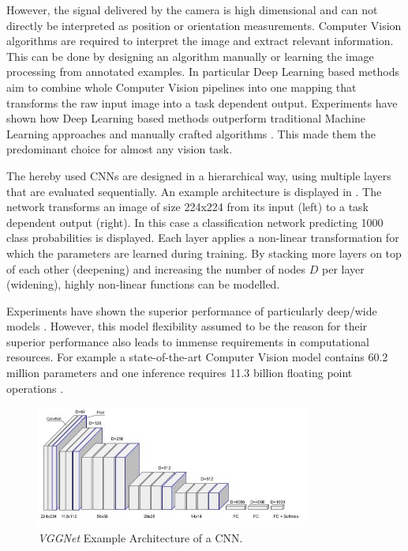 However, the signal delivered by the camera is high dimensional and can not directly be interpreted as position or orientation measurements. Computer Vision algorithms are required to interpret the image and extract relevant information. This can be done by designing an algorithm manually or learning the image processing from annotated examples. In particular Deep Learning based methods aim to combine whole Computer Vision pipelines into one mapping that transforms the raw input image into a task dependent output. Experiments have shown how Deep Learning based methods outperform traditional Machine Learning approaches and manually crafted algorithms \cite{Razavian2014}. This made them the predominant choice for almost any vision task.

The hereby used \acp{CNN} are designed in a hierarchical way, using multiple layers that are evaluated sequentially. An example architecture is displayed in . The network transforms an image of size 224x224 from its input (left) to a task dependent output (right). In this case a classification network predicting 1000 class probabilities is displayed. Each layer applies a non-linear transformation for which the parameters are learned during training. By stacking more layers on top of each other (deepening) and increasing the number of nodes $D$ per layer (widening), highly non-linear functions can be modelled. 

Experiments have shown the superior performance of particularly deep/wide models \cite{He, He2015, Szegedy2014, Zagoruyko2016}. However, this model flexibility assumed to be the reason for their superior performance also leads to immense requirements in computational resources. For example a state-of-the-art Computer Vision model \cite{He2015} contains 60.2 million parameters and one inference requires 11.3 billion floating point operations \cite{Tschannen2017}. 

\begin{figure}[bhtp]
	\centering
	\includegraphics[width=0.8\textwidth]{fig/vgg_architecture}
	\caption{\textit{VGGNet} \cite{SimonyanZ14a} Example Architecture of a \ac{CNN}.}
	\label{fig:cnn_example}
\end{figure}


